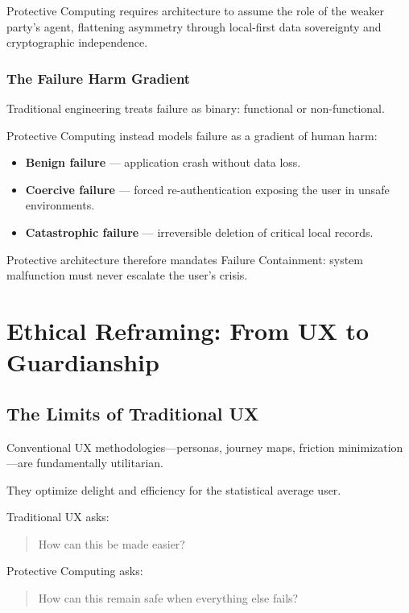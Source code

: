 \documentclass[12pt]{article}
\begin{document}
Protective Computing requires architecture to assume the role of the weaker party's agent, flattening asymmetry through local-first data sovereignty and cryptographic independence.

\subsubsection{The Failure Harm Gradient}
Traditional engineering treats failure as binary: functional or non-functional.

Protective Computing instead models failure as a gradient of human harm:

\begin{itemize}
\item \textbf{Benign failure} --- application crash without data loss.
\item \textbf{Coercive failure} --- forced re-authentication exposing the user in unsafe environments.
\item \textbf{Catastrophic failure} --- irreversible deletion of critical local records.
\end{itemize}

Protective architecture therefore mandates Failure Containment: system malfunction must never escalate the user's crisis.

\section{Ethical Reframing: From UX to Guardianship}

\subsection{The Limits of Traditional UX}
Conventional UX methodologies---personas, journey maps, friction minimization---are fundamentally utilitarian.

They optimize delight and efficiency for the statistical average user.

Traditional UX asks:

\begin{quote}
How can this be made easier?
\end{quote}

Protective Computing asks:

\begin{quote}
How can this remain safe when everything else fails?
\end{quote}
\end{document}
